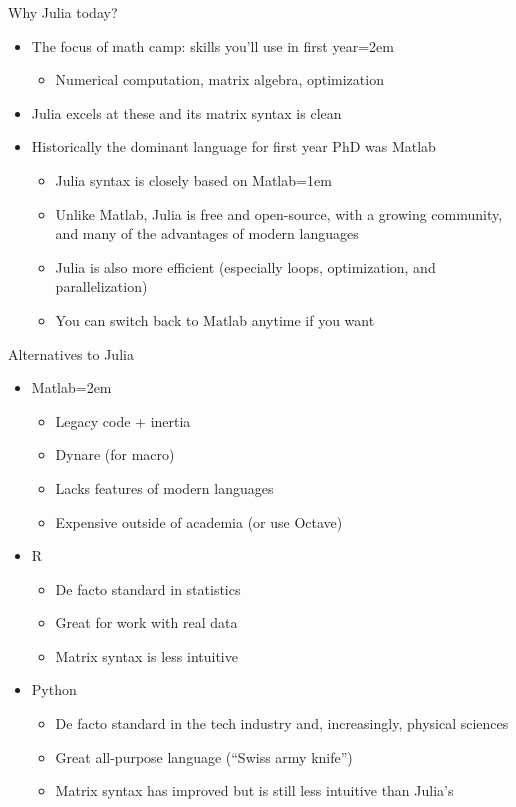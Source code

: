 \documentclass[handout]{beamer}
\begin{document}
\begin{frame}{Why Julia today?}
\begin{itemize}
    \item The focus of math camp: skills you'll use in first year\itemsep=2em
    \begin{itemize}
      \item Numerical computation, matrix algebra, optimization
    \end{itemize}
    \item Julia excels at these and its matrix syntax is clean
    \item<2-> Historically the dominant language for first year PhD was Matlab
    \begin{itemize}
        \item Julia syntax is closely based on Matlab\itemsep=1em
        \item Unlike Matlab, Julia is free and open-source, with a growing community, and many of the advantages of modern languages
        \item Julia is also more efficient (especially loops, optimization, and parallelization)
        \item You can switch back to Matlab anytime if you want
    \end{itemize}
\end{itemize}
\end{frame}

\begin{frame}{Alternatives to Julia}
\begin{itemize}
    \item Matlab\itemsep=2em
    \begin{itemize}
        \item Legacy code + inertia
        \item Dynare (for macro)
        \item Lacks features of modern languages
        \item Expensive outside of academia (or use Octave)
    \end{itemize}
    \item<2-> R
    \begin{itemize}
        \item De facto standard in statistics
        \item Great for work with real data
        \item Matrix syntax is less intuitive
    \end{itemize}
    \item<3-> Python
    \begin{itemize}
        \item De facto standard in the tech industry and, increasingly, physical sciences
        \item Great all-purpose language (``Swiss army knife'')
        \item Matrix syntax has improved but is still less intuitive than Julia's
    \end{itemize}
\end{itemize}
\end{frame}
\end{document}
